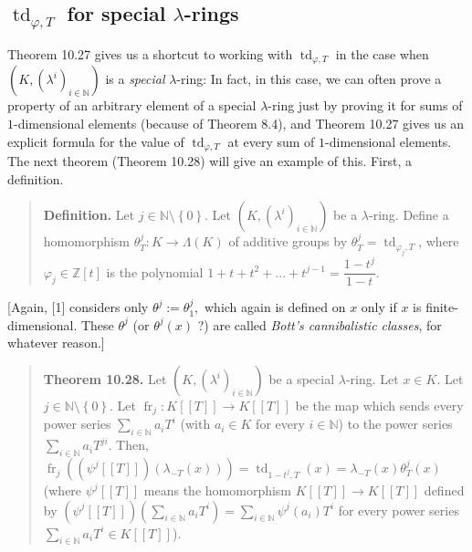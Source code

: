 \documentclass[numbers=enddot,12pt,final,onecolumn,notitlepage]{scrartcl}%
\begin{document}
\subsection{ $\operatorname*{td}_{\varphi,T}$ for special $\lambda$-rings}

Theorem 10.27 gives us a shortcut to working with $\operatorname*{td}%
\nolimits_{\varphi,T}$ in the case when $\left(  K,\left(  \lambda^{i}\right)
_{i\in\mathbb{N}}\right)  $ is a \textit{special} $\lambda$-ring: In fact, in
this case, we can often prove a property of an arbitrary element of a special
$\lambda$-ring just by proving it for sums of $1$-dimensional elements
(because of Theorem 8.4), and Theorem 10.27 gives us an explicit formula for
the value of $\operatorname*{td}\nolimits_{\varphi,T}$ at every sum of
$1$-dimensional elements. The next theorem (Theorem 10.28) will give an
example of this. First, a definition.

\begin{quote}
\textbf{Definition.} Let $j\in\mathbb{N}\setminus\left\{  0\right\}  $. Let
$\left(  K,\left(  \lambda^{i}\right)  _{i\in\mathbb{N}}\right)  $ be a
$\lambda$-ring. Define a homomorphism $\theta_{T}^{j}:K\rightarrow
\Lambda\left(  K\right)  $ of additive groups by $\theta_{T}^{j}%
=\operatorname*{td}_{\varphi_{j},T}$, where $\varphi_{j}\in\mathbb{Z}\left[
t\right]  $ is the polynomial $1+t+t^{2}+...+t^{j-1}=\dfrac{1-t^{j}}{1-t}$.
\end{quote}

[Again, [1] considers only $\theta^{j}:=\theta_{1}^{j},$ which again is
defined on $x$ only if $x$ is finite-dimensional. These $\theta^{j}$ (or
$\theta^{j}\left(  x\right)  $ ?) are called \textit{Bott's cannibalistic
classes}, for whatever reason.]

\begin{quote}
\textbf{Theorem 10.28.} Let $\left(  K,\left(  \lambda^{i}\right)
_{i\in\mathbb{N}}\right)  $ be a special $\lambda$-ring. Let $x\in K$. Let
$j\in\mathbb{N}\setminus\left\{  0\right\}  $. Let $\operatorname*{fr}%
\nolimits_{j}:K\left[  \left[  T\right]  \right]  \rightarrow K\left[  \left[
T\right]  \right]  $ be the map which sends every power series $\sum
\limits_{i\in\mathbb{N}}a_{i}T^{i}$ (with $a_{i}\in K$ for every
$i\in\mathbb{N}$) to the power series $\sum\limits_{i\in\mathbb{N}}a_{i}%
T^{ji}$. Then, $\operatorname*{fr}\nolimits_{j}\left(  \left(  \psi^{j}\left[
\left[  T\right]  \right]  \right)  \left(  \lambda_{-T}\left(  x\right)
\right)  \right)  =\operatorname*{td}\nolimits_{1-t^{j},T}\left(  x\right)
=\lambda_{-T}\left(  x\right)  \theta_{T}^{j}\left(  x\right)  $ (where
$\psi^{j}\left[  \left[  T\right]  \right]  $ means the homomorphism $K\left[
\left[  T\right]  \right]  \rightarrow K\left[  \left[  T\right]  \right]  $
defined by $\left(  \psi^{j}\left[  \left[  T\right]  \right]  \right)
\left(  \sum\limits_{i\in\mathbb{N}}a_{i}T^{i}\right)  =\sum\limits_{i\in
\mathbb{N}}\psi^{j}\left(  a_{i}\right)  T^{i}$ for every power series
$\sum\limits_{i\in\mathbb{N}}a_{i}T^{i}\in K\left[  \left[  T\right]  \right]
$).
\end{quote}
\end{document}
